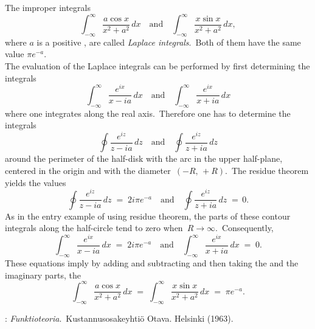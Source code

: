 \documentclass[12pt]{article}
\theoremstyle{definition}
\begin{document}
The improper integrals
$$\displaystyle\int_{-\infty}^\infty\frac{a\cos{x}}{x^2\!+\!a^2}\,dx \quad 
\mbox{and} \quad \int_{-\infty}^\infty\frac{x\sin{x}}{x^2\!+\!a^2}\,dx,$$
where $a$ is a positive , are called {\em Laplace integrals}.\, Both of them have the same value $\pi e^{-a}$.\\

The evaluation of the Laplace integrals can be performed by first determining the integrals
$$\int_{-\infty}^\infty\frac{e^{ix}}{x-ia}\,dx \quad 
\mbox{and} \quad \int_{-\infty}^\infty\frac{e^{ix}}{x+ia}\,dx$$
where one integrates along the real axis.\, Therefore one has to determine the integrals
$$\oint\frac{e^{iz}}{z-ia}\,dz \quad \mbox{and} \quad \oint\frac{e^{iz}}{z+ia}\,dz$$
around the perimeter of the half-disk with the arc in the upper half-plane, centered in the origin and with the diameter \,$(-R,\,+R)$.\, The residue theorem yields the values
$$\oint\frac{e^{iz}}{z-ia}\,dz \;=\; 2i\pi e^{-a}
\quad \mbox{and} \quad \oint\frac{e^{iz}}{z+ia}\,dz \;=\, 0.$$
As in the entry example of using residue theorem, the parts of these contour integrals along the half-circle tend to zero when\, $R \to \infty$.\, Consequently, 
$$\int_{-\infty}^\infty\frac{e^{ix}}{x-ia}\,dx \;=\; 2i\pi e^{-a}\quad 
\mbox{and} \quad \int_{-\infty}^\infty\frac{e^{ix}}{x+ia}\,dx \;=\; 0.$$
These equations imply by adding and subtracting and then taking the  and the imaginary parts, the 
$$\displaystyle\int_{-\infty}^\infty\frac{a\cos{x}}{x^2\!+\!a^2}\,dx 
\;=\; \int_{-\infty}^\infty\frac{x\sin{x}}{x^2\!+\!a^2}\,dx \;=\; \pi e^{-a}.$$

\begin{thebibliography}{9}
: {\em Funktioteoria}.\, Kustannusosakeyhti\"o Otava. Helsinki (1963).
\end{thebibliography}

\end{document}
